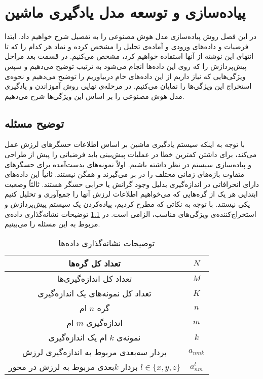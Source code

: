 \chapter{پیاده‌سازی و توسعه مدل یادگیری ماشین}

در این فصل روش پیاده‌سازی مدل هوش مصنوعی را به تفصیل شرح خواهیم داد. ابتدا فرضیات و داده‌های ورودی و آماده‌ی تحلیل را مشخص کرده و نماد هر کدام را که تا انتهای این نوشته از آنها استفاده خواهیم کرد، مشخص می‌کنیم. در قسمت بعد مراحل پیش‌پردازش را که روی این داده‌ها انجام می‌شود به ترتیب توضیح می‌دهیم و سپس ویژگی‌هایی که نیاز داریم از این داده‌های خام دربیاوریم را توضیح می‌دهیم و نحوه‌ی استخراج این ویژگی‌ها را نمایان می‌کنیم. در مرحله‌ی نهایی روش آموزاندن و یادگیری مدل هوش مصنوعی را بر اساس این ویژگی‌ها شرح می‌دهیم.


\section{توضیح مسئله}
با توجه به اینکه سیستم یادگیری ماشین بر اساس اطلاعات حسگرهای لرزش عمل می‌کند، برای داشتن کمترین خطا در عملیات پیش‌بینی باید فرضیاتی را پیش از طراحی و پیاده‌سازی سیستم در نظر داشته باشیم. اولاً نمونه‌های بدست‌آمده برای حسگرهای متفاوت بازه‌های زمانی مختلف را در بر می‌گیرند و همگن نیستند. ثانیاً این داده‌های دارای انحرافاتی در اندازه‌گیری بدلیل وجود گرانش یا خرابی حسگر هستند. ثالثاً وضعیت ابتدایی هر یک از گره‌هایی که می‌خواهیم اطلاعات لرزش آنها را جمع‌آوری و تحلیل کنیم یکی نیستند\cite{jung2017vibration}. با توجه به نکاتی که مطرح کردیم، پیاده‌کردن یک سیستم پیش‌پردازش و استخراج‌کننده‌ی ویژگی‌های مناسب، الزامی است. در \cref{table:notation_description} توضیحات نشانه‌گذاری داده‌ی مربوط به این مسئله را می‌بینیم.

\begin{table}[h!]
  \begin{center}
    \caption{توضیحات نشانه‌گذاری داده‌ها}
    \label{table:notation_description}
    \begin{tabular}{|c|c|} %
    	\hline
تعداد کل گره‌ها & $N$\\
    	\hline
 تعداد کل اندازه‌گیری‌ها & $M$\\
    	\hline
   تعداد کل نمونه‌های یک اندازه‌گیری & $K$\\
    	\hline
گره $n$ ام & $n$\\
 	\hline
اندازه‌گیری $m$ ام & $m$\\
 	\hline
نمونه‌ی $k$ ام یک اندازه‌گیری & $k$\\
 	\hline
بردار سه‌بعدی مربوط به اندازه‌گیری لرزش & $a_{nmk}$\\
 	\hline
بردار $k$بعدی مربوط به لرزش در محور $l \in \{x, y, z\}$  & $a^l_{nm}$\\
 	\hline
    \end{tabular}
  \end{center}
\end{table} 


